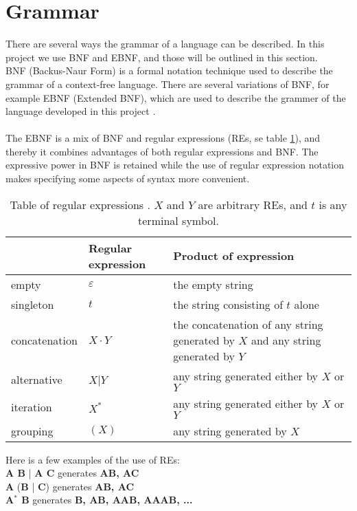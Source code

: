 \section{Grammar}
\label{sec:ebnf}

There are several ways the grammar of a language can be described. In this project we use BNF and EBNF, and those will be outlined in this section.\\ \indent
BNF (Backus-Naur Form) is a formal notation technique used to describe the grammar of a context-free language. There are several variations of BNF, for example EBNF (Extended BNF), which are used to describe the grammer of the language developed in this project \cite{misc:spo}.\\
\\
The EBNF is a mix of BNF and regular expressions (REs, se table \ref{tab:re}), and thereby it combines advantages of both regular expressions and BNF. The expressive power in BNF is retained while the use of regular expression notation makes specifying some aspects of syntax more convenient.

\begin{center}
	\begin{table}[H]
    \begin{tabular}{ | l | l | p{6.5cm} |}
    \hline
     & Regular expression & Product of expression\\ \hline
    empty & $\varepsilon$ & the empty string\\ \hline
    singleton & $t$ & the string consisting of $t$ alone\\ \hline
    concatenation & $X \cdot Y$ & the concatenation of any string generated	by $X$ and any string generated by $Y$\\ \hline
		alternative & $X$|$Y$ & any string generated either by $X$ or $Y$\\ \hline
		iteration & $X^*$ & any string generated either by $X$ or $Y$\\ \hline
		grouping & $(X)$ & any string generated by $X$\\ \hline
    \end{tabular}
		\caption{Table of regular expressions \cite{misc:spo}. $X$ and $Y$ are arbitrary REs, and $t$ is any terminal symbol.}
		\label{tab:re}
	\end{table}
\end{center}

Here is a few examples of the use of REs: \\
\textbf{A B} | \textbf{A C} generates \textbf{{AB, AC}} \\
\textbf{A} (\textbf{B} | \textbf{C}) generates \textbf{{AB, AC}} \\
\textbf{A$^*$ B} generates \textbf{{B, AB, AAB, AAAB, ...}} \\


